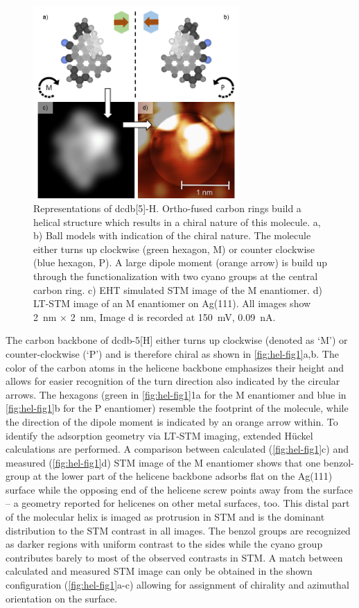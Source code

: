 \begin{figure} \centering
	\includegraphics[width=0.7\textwidth]{./images/paper/helicene/fig1}
	\caption{Representations of dcdb[5]-H. Ortho-fused carbon rings build a helical structure which results in a chiral nature of this molecule. a, b) Ball models with indication of the chiral nature. The molecule either turns up clockwise (green hexagon, M) or counter clockwise (blue hexagon, P). A large dipole moment (orange arrow) is build up through the functionalization with two cyano groups at the central carbon ring. c) EHT simulated STM image of the M enantiomer. d) LT-STM image of an M enantiomer on Ag(111). All images show \SI{2}{\nano \meter} $\times$ \SI{2}{\nano \meter}, Image d is recorded at \SI{150}{\milli \volt}, \SI{0.09}{\nano \ampere}.}
	\label{fig:hel-fig1}
\end{figure}

The carbon backbone of dcdb-5[H] either turns up clockwise (denoted as ‘M’) or counter-clockwise (‘P’) and is therefore chiral as shown in \autoref{fig:hel-fig1}a,b. The color of the carbon atoms in the helicene backbone emphasizes their height and allows for easier recognition of the turn direction also indicated by the circular arrows. The hexagons (green in \autoref{fig:hel-fig1}1a for the M enantiomer and blue in \autoref{fig:hel-fig1}b for the P enantiomer) resemble the footprint of the molecule, while the direction of the dipole moment is indicated by an orange arrow within. To identify the adsorption geometry via LT-STM imaging, extended Hückel calculations are performed. A comparison between calculated (\autoref{fig:hel-fig1}c) and measured (\autoref{fig:hel-fig1}d) STM image of the M enantiomer shows that one benzol-group at the lower part of the helicene backbone  adsorbs flat on the Ag(111) surface while the opposing end of the helicene screw points away from the surface – a geometry reported for helicenes on other metal surfaces, too.\cite{Fasel_Orientation_2001} This distal part of the molecular helix is imaged as protrusion in STM and is the dominant distribution to the STM contrast in all images. The benzol groups are recognized as darker regions with uniform contrast to the sides while the cyano group contributes barely to most of the observed contrasts in STM. A match between calculated and measured STM image can only be obtained in the shown configuration (\autoref{fig:hel-fig1}a-c) allowing for assignment of chirality and azimuthal orientation on the surface.


